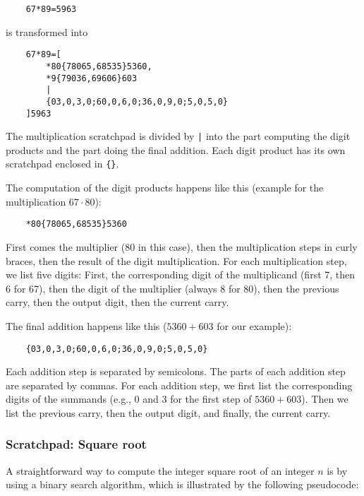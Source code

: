 \begin{lstlisting}
    67*89=5963
\end{lstlisting}

\noindent
is transformed into

\begin{lstlisting}
    67*89=[
        *80{78065,68535}5360,
        *9{79036,69606}603
        |
        {03,0,3,0;60,0,6,0;36,0,9,0;5,0,5,0}
    ]5963
\end{lstlisting}

\noindent
The multiplication scratchpad is divided by \verb!|! into the part computing the digit products and the part doing the final addition.
Each digit product has its own scratchpad enclosed in \verb!{}!.

The computation of the digit products happens like this (example for the multiplication $67 \cdot 80$):

\begin{lstlisting}
	*80{78065,68535}5360
\end{lstlisting}

First comes the multiplier (80 in this case), then the multiplication steps in curly braces, then the result of the digit multiplication.
For each multiplication step, we list five digits: First, the corresponding digit of the multiplicand (first 7, then 6 for 67), then the digit of the multiplier (always 8 for 80), then the previous carry, then the output digit, then the current carry.

The final addition happens like this ($5360+603$ for our example):

\begin{lstlisting}
	{03,0,3,0;60,0,6,0;36,0,9,0;5,0,5,0}
\end{lstlisting}

Each addition step is separated by semicolons. The parts of each addition step are separated by commas. For each addition step, we first list the corresponding digits of the summands (e.g., 0 and 3 for the first step of $5360+603$). Then we list the previous carry, then the output digit, and finally, the current carry.

\subsubsection{Scratchpad: Square root}
\label{sqrt_scratchpad}

A straightforward way to compute the integer square root of an integer $n$ is by using a binary search algorithm, which is illustrated by the following pseudocode:

